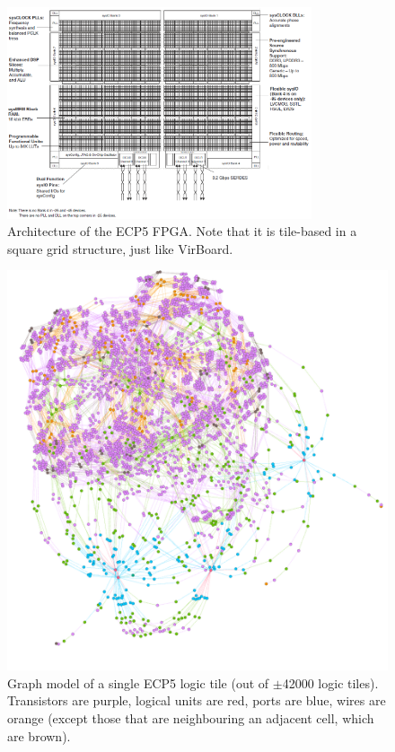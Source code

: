 \begin{figure}
\centering
\includegraphics[width=0.8\textwidth]{images/ECP5Architecture.png}
\caption[Architecture of the ECP5 FPGA. Note that it is tile-based in a square grid structure, just like VirBoard.]{Architecture of the ECP5 FPGA. Note that it is tile-based in a square grid structure, just like VirBoard.\footnotemark}
\label{fig:ecp5architecture}
\end{figure}

\begin{figure}
\centering
\includegraphics[width=1\textwidth]{images/gephiScreenshot.png}
\caption{Graph model of a single ECP5 logic tile (out of $\pm$42000 logic tiles). Transistors are purple, logical units are red, ports are blue, wires are orange (except those that are neighbouring an adjacent cell, which are brown).}
\label{fig:ECPTGephi}
\end{figure}



